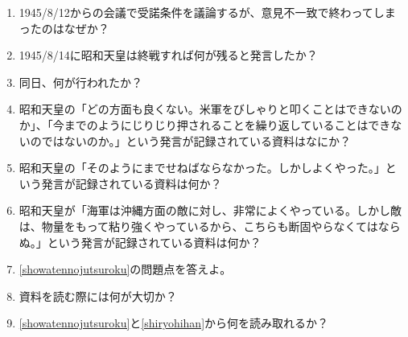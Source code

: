 \documentclass[]{jsarticle}
\begin{document}
\begin{enumerate}
	\item 1945/8/12からの会議で受諾条件を議論するが、意見不一致で終わってしまったのはなぜか？
	\item 1945/8/14に昭和天皇は終戦すれば何が残ると発言したか？
	\item 同日、何が行われたか？
	\\
	\item 昭和天皇の「どの方面も良くない。米軍をびしゃりと叩くことはできないのか」、「今までのようにじりじり押されることを繰り返していることはできないのではないのか。」という発言が記録されている資料はなにか？
	\item 昭和天皇の「そのようにまでせねばならなかった。しかしよくやった。」という発言が記録されている資料は何か？
	\item 昭和天皇が「海軍は沖縄方面の敵に対し、非常によくやっている。しかし敵は、物量をもって粘り強くやっているから、こちらも断固やらなくてはならぬ。」という発言が記録されている資料は何か？
	\item \ref{showatennojutsuroku}の問題点を答えよ。
	\item 資料を読む際には何が大切か？\label{shiryohihan}
	\item \ref{showatennojutsuroku}と\ref{shiryohihan}から何を読み取れるか？
\end{enumerate}

\begin{comment}
	\begin{figure}[htbp]
		\begin{center}
			\texttt{[image: ./src/RC\_series\_circuit\_c.png]}
			\caption{RC直列回路 ($V_C$の測定)}
			\label{fig:RC_series_circuit_c}
		\end{center}
	\end{figure}
	\begin{equation}
		\label{Relationship_between_impedance_Z}
		V = ZI [\si{\volt}], I = \frac{V}{Z} [\si{\ampere}], Z = \frac{V}{I}[\si{\ohm}]
	\end{equation}
	\begin{table}[h]
		\caption{計測および実験補助器具}
		\label{tab:fixtures}
		\centering
		\begin{tabular}{|c|c|c|c|}
			\hline
			器具名 & 製造元 & 計器番号 & 定格 \\
		\end{tabular}
	\end{table}
\end{comment}
\end{document}
